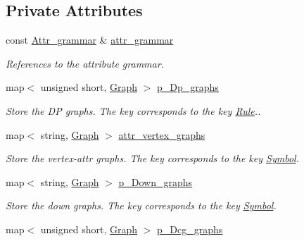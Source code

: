 \subsection*{Private Attributes}
\begin{DoxyCompactItemize}
\item 
const \hyperlink{classgenevalmag_1_1Attr__grammar}{Attr\_\-grammar} \& \hyperlink{classgenevalmag_1_1Builder__graphs_a10e4acb76015aeea26cf61980a3c6e33}{attr\_\-grammar}
\begin{DoxyCompactList}\small\item\em References to the attribute grammar. \item\end{DoxyCompactList}\item 
map$<$ unsigned short, \hyperlink{namespacegenevalmag_a4a96de9ebfc7d48233406ab9cad55cb5}{Graph} $>$ \hyperlink{classgenevalmag_1_1Builder__graphs_a2f001cd797840683731d524214cd6d13}{p\_\-Dp\_\-graphs}
\begin{DoxyCompactList}\small\item\em Store the DP graphs. The key corresponds to the key \hyperlink{classgenevalmag_1_1Rule}{Rule}.. \item\end{DoxyCompactList}\item 
map$<$ string, \hyperlink{namespacegenevalmag_a4a96de9ebfc7d48233406ab9cad55cb5}{Graph} $>$ \hyperlink{classgenevalmag_1_1Builder__graphs_ae5a3713f467704d2e3dc67da86ded862}{attr\_\-vertex\_\-graphs}
\begin{DoxyCompactList}\small\item\em Store the vertex-\/attr graphs. The key corresponds to the key \hyperlink{classgenevalmag_1_1Symbol}{Symbol}. \item\end{DoxyCompactList}\item 
map$<$ string, \hyperlink{namespacegenevalmag_a4a96de9ebfc7d48233406ab9cad55cb5}{Graph} $>$ \hyperlink{classgenevalmag_1_1Builder__graphs_a05fcf30d7286884794303103544979c4}{p\_\-Down\_\-graphs}
\begin{DoxyCompactList}\small\item\em Store the down graphs. The key corresponds to the key \hyperlink{classgenevalmag_1_1Symbol}{Symbol}. \item\end{DoxyCompactList}\item 
map$<$ unsigned short, \hyperlink{namespacegenevalmag_a4a96de9ebfc7d48233406ab9cad55cb5}{Graph} $>$ \hyperlink{classgenevalmag_1_1Builder__graphs_afe54574f0045851288fae27ce01a8f4f}{p\_\-Dcg\_\-graphs}

\end{DoxyCompactItemize}
